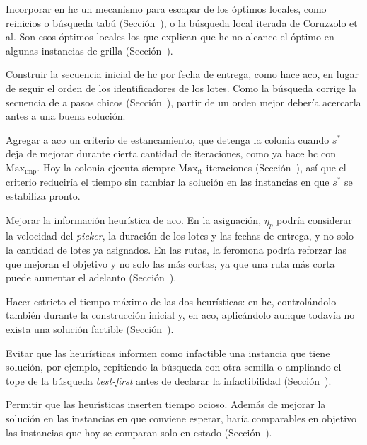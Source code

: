 \stopsubsection

\startsubsection[title={Heurísticas}]

\startitemize
	\item Incorporar en \ac{hc} un mecanismo para escapar de los óptimos
	locales, como reinicios o búsqueda tabú
	(Sección~), o la búsqueda local iterada de Coruzzolo et
	al. Son esos óptimos locales los que explican que \ac{hc} no alcance el
	óptimo en algunas instancias de grilla (Sección~).
	\item Construir la secuencia inicial de \ac{hc} por fecha de entrega, como
	hace \ac{aco}, en lugar de seguir el orden de los identificadores de los
	lotes. Como la búsqueda corrige la secuencia de a pasos chicos
	(Sección~), partir de un orden mejor debería
	acercarla antes a una buena solución.
	\item Agregar a \ac{aco} un criterio de estancamiento, que detenga la
	colonia cuando $s^*$ deja de mejorar durante cierta cantidad de
	iteraciones, como ya hace \ac{hc} con $\text{Max}_{\text{imp}}$. Hoy la
	colonia ejecuta siempre $\text{Max}_{\text{it}}$ iteraciones
	(Sección~), así que el criterio reduciría el
	tiempo sin cambiar la solución en las instancias en que $s^*$ se estabiliza
	pronto.
	\item Mejorar la información heurística de \ac{aco}. En la asignación,
	$\eta_p$ podría considerar la velocidad del {\em picker}, la duración de
	los lotes y las fechas de entrega, y no solo la cantidad de lotes ya
	asignados. En las rutas, la feromona podría reforzar las que mejoran el
	objetivo y no solo las más cortas, ya que una ruta más corta puede
	aumentar el adelanto (Sección~).
	\item Hacer estricto el tiempo máximo de las dos heurísticas: en \ac{hc},
	controlándolo también durante la construcción inicial y, en \ac{aco},
	aplicándolo aunque todavía no exista una solución factible
	(Sección~).
	\item Evitar que las heurísticas informen como infactible una instancia que
	tiene solución, por ejemplo, repitiendo la búsqueda con otra semilla o
	ampliando el tope de la búsqueda {\em best-first} antes de declarar la
	infactibilidad (Sección~).
	\item Permitir que las heurísticas inserten tiempo ocioso. Además de
	mejorar la solución en las instancias en que conviene esperar, haría
	comparables en objetivo las instancias que hoy se comparan solo en estado
	(Sección~).
\stopitemize

